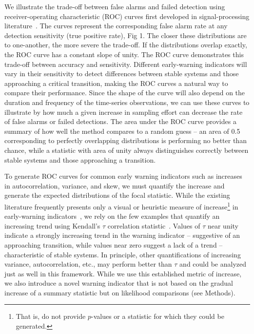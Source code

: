 \documentclass{pnastwo}
\begin{document}
\begin{article}
We illustrate the trade-off between false alarms and failed detection using 
receiver-operating characteristic (ROC) curves first developed in signal-processing literature~\cite{Green1989, Keller2009}⁠. 
The curves represent the corresponding false alarm rate at any detection sensitivity (true positive rate), Fig 1.
The closer these distributions are to one-another, the more severe the trade-off.  
If the distributions overlap exactly, the ROC curve has a constant slope of unity.  
The ROC curve demonstrates this trade-off between accuracy and sensitivity.  
Different early-warning indicators will vary in their sensitivity to detect differences between stable systems and those approaching a critical transition, making the ROC curves a natural way to compare their performance.  
Since the shape of the curve will also depend on the duration and frequency of the time-series observations,
we can use these curves to illustrate by how much a given increase in sampling effort can decrease the rate of false alarms or failed detections.  
The area under the ROC curve provides a summary of how well the method compares to a random guess --
an area of 0.5 corresponding to perfectly overlapping distributions is performing no better than chance, while a statistic with area of unity always distinguishes correctly between stable systems and those approaching a transition. 

To generate ROC curves for common early warning indicators such as 
increases in autocorrelation, variance, and skew, 
we must quantify the increase and generate the expected distributions of the focal statistic.  
While the existing literature frequently presents only a 
visual or heuristic measure of increase\footnote{That is, do not provide $p$-values or a statistic for which they could be generated.} in early-warning indicators~\cite{Scheffer2009, Drake2010, Carpenter2011, Carpenter2006}, 
we rely on the few examples that quantify an increasing trend using Kendall's $\tau$ correlation statistic~\cite{Dakos2008, Dakos2011, Dakos2009}.
Values of $\tau$ near unity indicate a strongly increasing trend in the warning indicator --
suggestive of an approaching transition, while values near zero suggest a lack of a trend -- characteristic of stable systems.
In principle, other quantifications of increasing variance, autocorrelation, etc.,
may perform better than $\tau$ and could be analyzed just as well in this framework. 
While we use this established metric of increase, we also introduce a novel warning indicator
that is not based on the gradual increase of a summary statistic but on likelihood comparisons (see Methods).  


\end{article}
\end{document}
